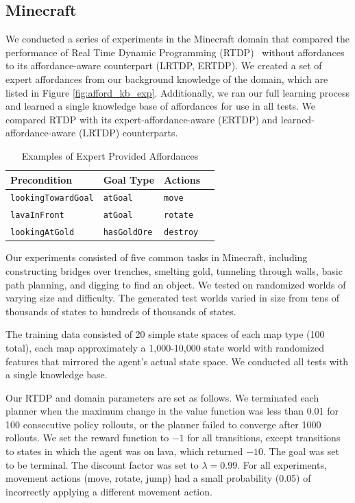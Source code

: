 \documentclass[letterpaper]{article}
\newcommand{\ra}[1]{\renewcommand{\arraystretch}{#1}} %
\begin{document}
\subsection{Minecraft}
We conducted a series of experiments in the Minecraft domain that
compared the performance of Real Time Dynamic Programming (RTDP)~\citep{barto95}
without affordances to its affordance-aware counterpart (LRTDP, ERTDP). We created a set of expert
affordances from our background knowledge of the domain, which are
listed in Figure \ref{fig:afford_kb_exp}. Additionally, we ran our full
learning process and learned a single knowledge base of affordances for use in all tests. We compared
RTDP with its expert-affordance-aware (ERTDP) and learned-affordance-aware (LRTDP)
counterparts.

\begin{table}[b]
\ra{1.4}
\begin{tabular}{@{}llll@{}}\toprule
Precondition & Goal Type & Actions \\ \midrule
\texttt{lookingTowardGoal} & \texttt{atGoal} & \texttt{move} \\
\texttt{lavaInFront} & \texttt{atGoal} & \texttt{rotate} \\
\texttt{lookingAtGold} & \texttt{hasGoldOre} & \texttt{destroy} \\
\bottomrule
\end{tabular}
\label{table:afford_kb_exp}
\caption{Examples of Expert Provided Affordances}
\end{table}

Our experiments consisted of five common tasks in Minecraft, including
constructing bridges over trenches, smelting gold, tunneling
through walls, basic path planning, and digging to find an object.  We tested on 
randomized worlds of varying size and difficulty. The generated test
worlds varied in size from tens of thousands of states to hundreds of thousands of states.

The training data consisted of 20 simple state spaces of each map type
(100 total), each map approximately a 1,000-10,000 state world with
randomized features that mirrored the agent's actual state space. We conducted all tests
with a single knowledge base.

Our RTDP and domain parameters are set as follows. We terminated each planner
when the maximum change in the value function was less than 0.01 for
100 consecutive policy rollouts, or the planner failed to converge
after 1000 rollouts.  We set the reward function to $-1$ for all
transitions, except transitions to states in which the agent was on
lava, which returned $-10$. The goal was set to be terminal. The
discount factor was set to $\lambda = 0.99$. For all experiments,
movement actions (move, rotate, jump) had a small probability (0.05)
of incorrectly applying a different movement action.
\end{document}
